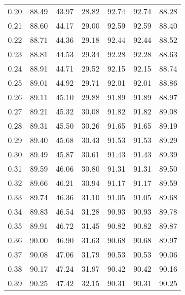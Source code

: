\begin{tabular}{|c|c|c|c|c|c|c|}
      0.20 &     88.49 &     43.97 &      28.82 &   92.74 &      92.74 &         88.28 \\
      0.21 &     88.60 &     44.17 &      29.00 &   92.59 &      92.59 &         88.40 \\
      0.22 &     88.71 &     44.36 &      29.18 &   92.44 &      92.44 &         88.52 \\
      0.23 &     88.81 &     44.53 &      29.34 &   92.28 &      92.28 &         88.63 \\
      0.24 &     88.91 &     44.71 &      29.52 &   92.15 &      92.15 &         88.74 \\
      0.25 &     89.01 &     44.92 &      29.71 &   92.01 &      92.01 &         88.86 \\
      0.26 &     89.11 &     45.10 &      29.88 &   91.89 &      91.89 &         88.97 \\
      0.27 &     89.21 &     45.32 &      30.08 &   91.82 &      91.82 &         89.08 \\
      0.28 &     89.31 &     45.50 &      30.26 &   91.65 &      91.65 &         89.19 \\
      0.29 &     89.40 &     45.68 &      30.43 &   91.53 &      91.53 &         89.29 \\
      0.30 &     89.49 &     45.87 &      30.61 &   91.43 &      91.43 &         89.39 \\
      0.31 &     89.59 &     46.06 &      30.80 &   91.31 &      91.31 &         89.50 \\
      0.32 &     89.66 &     46.21 &      30.94 &   91.17 &      91.17 &         89.59 \\
      0.33 &     89.74 &     46.36 &      31.10 &   91.05 &      91.05 &         89.68 \\
      0.34 &     89.83 &     46.54 &      31.28 &   90.93 &      90.93 &         89.78 \\
      0.35 &     89.91 &     46.72 &      31.45 &   90.82 &      90.82 &         89.87 \\
      0.36 &     90.00 &     46.90 &      31.63 &   90.68 &      90.68 &         89.97 \\
      0.37 &     90.08 &     47.06 &      31.79 &   90.53 &      90.53 &         90.06 \\
      0.38 &     90.17 &     47.24 &      31.97 &   90.42 &      90.42 &         90.16 \\
      0.39 &     90.25 &     47.42 &      32.15 &   90.31 &      90.31 &         90.25 \\

\end{tabular}
